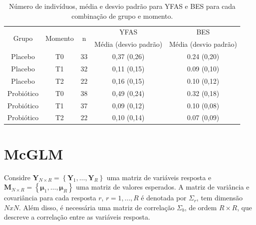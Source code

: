 \documentclass[AMA,STIX1COL]{WileyNJD-v2}
\begin{document}
\begin{table}[H]
\centering
\begin{tabular}{ccccc}
\hline
\multirow{2}{*}{Grupo} & \multirow{2}{*}{Momento} & \multirow{2}{*}{n} & YFAS                  & BES                   \\ \cline{4-5} 
                       &                          &                    & Média (desvio padrão) & Média (desvio padrão) \\ \hline
Placebo                & T0                       & 33                 & 0,37 (0,26)           & 0.24 (0,20)           \\
Placebo                & T1                       & 32                 & 0,11 (0,15)           & 0.09 (0,10)           \\
Placebo                & T2                       & 22                 & 0,16 (0,15)           & 0.10 (0,12)           \\
Probiótico             & T0                       & 38                 & 0,49 (0,24)           & 0.32 (0,18)           \\
Probiótico             & T1                       & 37                 & 0,09 (0,12)           & 0.10 (0,08)           \\
Probiótico             & T2                       & 22                 & 0,10 (0,14)           & 0.07 (0,09)           \\ \hline
\end{tabular}
\caption{Número de indivíduos, média e desvio padrão para YFAS e BES para cada combinação de grupo e momento.}
\label{tab:descritiva1}
\end{table}


\section{McGLM}\label{sec3}

Considre $\boldsymbol{Y}_{N \times R} = \left \{ \boldsymbol{Y}_1, \dots, \boldsymbol{Y}_R \right \}$ uma  matriz de variáveis resposta e $\boldsymbol{M}_{N \times R} = \left \{ \boldsymbol{\mu}_1, \dots, \boldsymbol{\mu}_R \right \}$ uma matriz de valores esperados. A matriz de variância e covariância para cada resposta $r$, $r = 1,..., R$ é denotada por $\Sigma_r$, tem dimensão $NxN$. Além disso, é necessária uma matriz de correlação $\Sigma_b$, de ordem $R \times R$, que descreve a correlação entre as variáveis resposta. 
\end{document}
